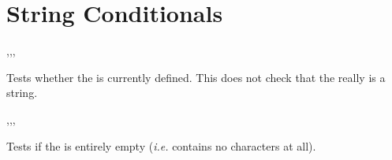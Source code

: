 \documentclass[oneside]{book}
\begin{document}
\section{String Conditionals}

\begin{function}{\StrIfExist,\StrIfExistT,\StrIfExistF,\StrIfExistTF}
\begin{syntax}
 
  
  
   
\end{syntax}
Tests whether the  is currently defined.  This does not
check that the  really is a string.
\begin{demohigh}
\StrIfExistTF {} {}
\StrIfExistTF {} {}
\end{demohigh}
\end{function}

\begin{function}{\StrVarIfEmpty,\StrVarIfEmptyT,\StrVarIfEmptyF,\StrVarIfEmptyTF}
\begin{syntax}
 
  
  
   
\end{syntax}
Tests if the  is entirely empty
(\emph{i.e.} contains no characters at all).
\begin{demohigh}
\StrSet {}
\StrVarIfEmptyTF {} {}
\StrClear \lTmpaStr
\StrVarIfEmptyTF {} {}
\end{demohigh}
\end{function}
\end{document}
